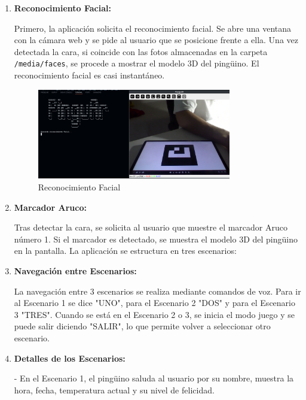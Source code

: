 \documentclass{article}
\begin{document}
\begin{enumerate}
    \item \textbf{Reconocimiento Facial:}
    
    Primero, la aplicación solicita el reconocimiento facial. Se abre una ventana con la cámara web y se pide al usuario que se posicione frente a ella. Una vez detectada la cara, si coincide con las fotos almacenadas en la carpeta \texttt{/media/faces}, se procede a mostrar el modelo 3D del pingüino. El reconocimiento facial es casi instantáneo.

	\begin{figure}[htbp]
	\centering
	\includegraphics[width=0.8\textwidth]{./images/1.png}
	\caption{Reconocimiento Facial}
	\label{fig:Reconocimiento Facial}
	\end{figure}

	\newpage

    \item \textbf{Marcador Aruco:}
    
    Tras detectar la cara, se solicita al usuario que muestre el marcador Aruco número 1. Si el marcador es detectado, se muestra el modelo 3D del pingüino en la pantalla. La aplicación se estructura en tres escenarios:

	\item \textbf{Navegación entre Escenarios:}
    
    La navegación entre 3 escenarios se realiza mediante comandos de voz. Para ir al Escenario 1 se dice "UNO", para el Escenario 2 "DOS" y para el Escenario 3 "TRES". Cuando se está en el Escenario 2 o 3, se inicia el modo juego y se puede salir diciendo "SALIR", lo que permite volver a seleccionar otro escenario.

    \item \textbf{Detalles de los Escenarios:}
    
    - En el Escenario 1, el pingüino saluda al usuario por su nombre, muestra la hora, fecha, temperatura actual y su nivel de felicidad.
	\vskip 0.1in


\end{enumerate}
\end{document}
